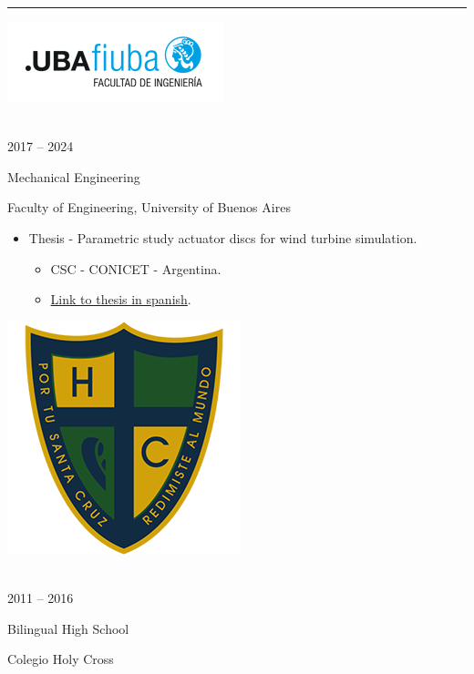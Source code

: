 \documentclass[a4paper,10pt]{article}
\newlength{\cvcolumngapwidth}
\newlength{\cvleftcolumnwidth}
\newlength{\cvrightcolumnwidth}
\newcommand{\cvsectionstyle}[1]{{\normalsize\cvsectionfont\textcolor{cvsectioncolor}{#1}}}
\newcommand{\cvtitlestyle}[1]{{\large\cvtitlefont\textcolor{cvtitlecolor}{#1}}}
\newcommand{\cvdurationstyle}[1]{{\small\cvdurationfont\textcolor{cvdurationcolor}{#1}}}
\newlength{\cvafteritemskipamount}
\newlength{\cvaftersectionskipamount}
\newlength{\cvaftertitleskipamount}
\newlength{\cvparskip}
\newcommand{\cvsection}[1]{
    \begin{minipage}[t]{\cvleftcolumnwidth}
        \raggedleft\cvsectionstyle{#1}
    \end{minipage}%
    \hspace{\cvcolumngapwidth}%
    \begin{minipage}[t]{\cvrightcolumnwidth}
        \textcolor{cvrulecolor}{\rule{\cvrightcolumnwidth}{0.3mm}}
    \end{minipage}

    \vspace{\cvaftersectionskipamount}
}
\newcommand{\cvitem}[2]{
    \begin{minipage}[t]{\cvleftcolumnwidth}
        \raggedleft #1
    \end{minipage}%
    \hspace{\cvcolumngapwidth}%
    \begin{minipage}[t]{\cvrightcolumnwidth}
        \setlength{\parskip}{\cvparskip} #2
    \end{minipage}

    \vspace{\cvafteritemskipamount}
}
\newcommand{\cvtitle}[1]{
    \cvtitlestyle{#1}

    \vspace{\cvaftertitleskipamount}
    \vspace{-\cvparskip}
}
\begin{document}

\cvsection{EDUCATION}

\cvitem{
 	\begin{minipage}{\textwidth}
   \begin{flushright}
		  \includegraphics[height=0.25\textwidth]{../logos-photos/Logo_FIUBA_new.png}   
    \end{flushright}  
  \end{minipage} \\
  \vspace{0.1cm}
  \cvdurationstyle{2017 -- 2024}
}{
  \cvtitle{Mechanical Engineering}

    Faculty of Engineering, University of Buenos Aires
    
    \begin{itemize}[leftmargin=*]
       \item \textsf{Thesis - Parametric study actuator discs for wind turbine simulation.} 
        \begin{itemize}
          \item CSC - CONICET - Argentina.
          \item \href{https://drive.google.com/file/d/1TWklGPKCdaIwJHuOc-fqAFvFS9hN7_sT/view?usp=sharing}{Link to thesis in spanish}.
        \end{itemize}
    \end{itemize}
}


\cvitem{
    \begin{minipage}{\textwidth}
        \flushright
        \includegraphics[height=0.2\textwidth]{../logos-photos/Logo_HC.png}   
    \end{minipage}\\  
    \vspace{0.1cm}
    \cvdurationstyle{2011 -- 2016}
}{
    \cvtitle{Bilingual High School}

    Colegio Holy Cross
}
\end{document}
